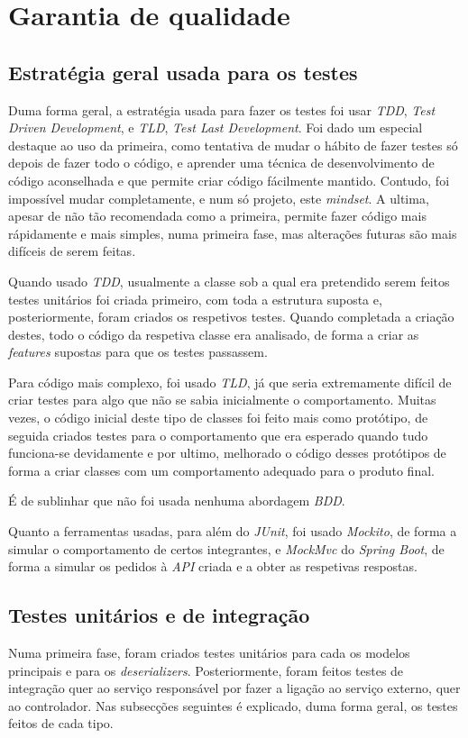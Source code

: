 
\chapter{Garantia de qualidade}

\section{Estratégia geral usada para os testes}
Duma forma geral, a estratégia usada para fazer os testes foi usar \textit{TDD}, \textit{Test Driven Development}, e \textit{TLD}, \textit{Test Last Development}. Foi dado um especial destaque ao uso da primeira, como tentativa de mudar o hábito de fazer testes só depois de fazer todo o código, e aprender uma técnica de desenvolvimento de código aconselhada e que permite criar código fácilmente mantido. Contudo, foi impossível mudar completamente, e num só projeto, este \textit{mindset}. A ultima, apesar de não tão recomendada como a primeira, permite fazer código mais rápidamente e mais simples, numa primeira fase, mas alterações futuras são mais difíceis de serem feitas.

Quando usado \textit{TDD}, usualmente a classe sob a qual era pretendido serem feitos testes unitários foi criada primeiro, com toda a estrutura suposta e, posteriormente, foram criados os respetivos testes. Quando completada a criação destes, todo o código da respetiva classe era analisado, de forma a criar as \textit{features} supostas para que os testes passassem.

Para código mais complexo, foi usado \textit{TLD}, já que seria extremamente difícil de criar testes para algo que não se sabia inicialmente o comportamento. Muitas vezes, o código inicial deste tipo de classes foi feito mais como protótipo, de seguida criados testes para o comportamento que era esperado quando tudo funciona-se devidamente e por ultimo, melhorado o código desses protótipos de forma a criar classes com um comportamento adequado para o produto final.

É de sublinhar que não foi usada nenhuma abordagem \textit{BDD}.

Quanto a ferramentas usadas, para além do \textit{JUnit}, foi usado \textit{Mockito}, de forma a simular o comportamento de certos integrantes, e \textit{MockMvc} do \textit{Spring Boot}, de forma a simular os pedidos à \textit{API} criada e a obter as respetivas respostas.


\section{Testes unitários e de integração}
Numa primeira fase, foram criados testes unitários para cada os modelos principais e para os \textit{deserializers}. Posteriormente, foram feitos testes de integração quer ao serviço responsável por fazer a ligação ao serviço externo, quer ao controlador. Nas subsecções seguintes é explicado, duma forma geral, os testes feitos de cada tipo.

